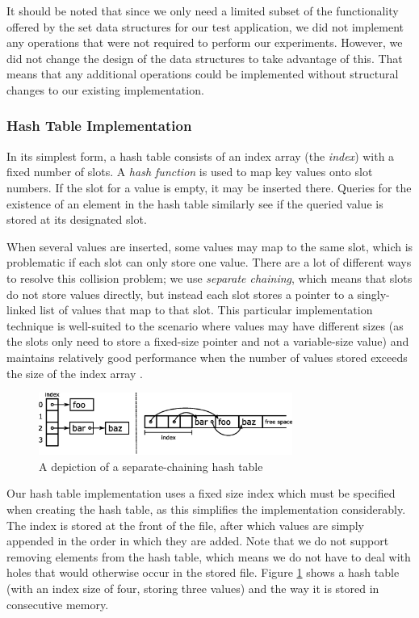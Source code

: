 \documentclass{acm_proc_article-sp}
\begin{document}
It should be noted that since we only need a limited subset of the functionality
offered by the set data structures for our test application, we did not
implement any operations that were not required to perform our experiments.
However, we did not change the design of the data structures to take advantage
of this. That means that any additional operations could be implemented without
structural changes to our existing implementation.

\subsubsection{Hash Table Implementation}
In its simplest form, a hash table consists of an
index array (the \emph{index}) with a fixed number of slots. A \emph{hash
function} is used to map key values onto slot numbers. If the slot for a value
is empty, it may be inserted there. Queries for the existence of an element in
the hash table similarly see if the queried value is stored at its designated
slot.

When several values are inserted, some values may map to the same slot,
which is problematic if each slot can only store one value. There
are a lot of different ways to resolve this collision problem; we use
\emph{separate chaining}, which means that slots do not store values directly,
but instead each slot stores a pointer to a singly-linked list of values that
map to that slot. This particular implementation technique is well-suited to
the scenario where values may have different sizes (as the slots only need to
store a fixed-size pointer and not a variable-size value) and maintains
relatively good performance when the number of values stored exceeds the size
of the index array \cite{sedgewick1998ac}.

\begin{figure}
\centering
\includegraphics[width=83mm]{hash-table}
\caption{A depiction of a separate-chaining hash table}
\label{fig-hash-table}
\end{figure}

Our hash table implementation uses a fixed size index which must be specified
when creating the hash table, as this simplifies the implementation
considerably. The index is stored at the front of the file, after which values
are simply appended in the order in which they are added. Note that we do not
support removing elements from the hash table, which means we do not have to
deal with holes that would otherwise occur in the stored file.
Figure \ref{fig-hash-table} shows a hash table (with an index size of four,
storing three values) and the way it is stored in consecutive memory.
\end{document}
